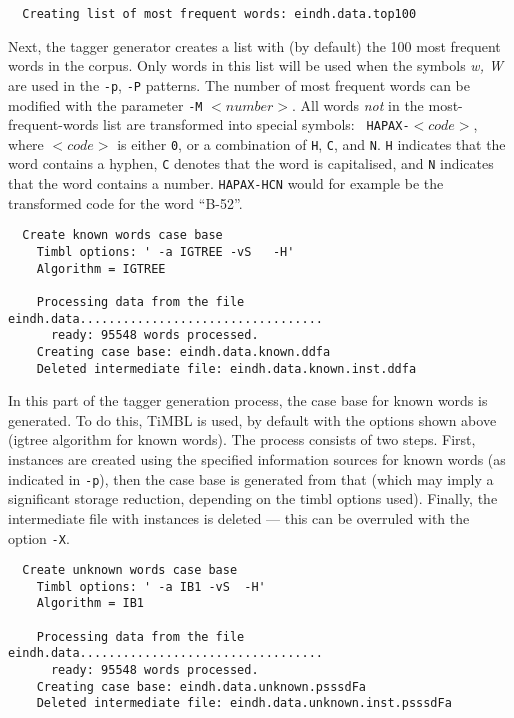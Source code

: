 \documentclass{report}
\begin{document}
{\small
\begin{verbatim}
  Creating list of most frequent words: eindh.data.top100
\end{verbatim}
}

Next, the tagger generator creates a list with (by default) the 100
most frequent words in the corpus. Only words in this list will be
used when the symbols {\em w, W} are used in the {\tt -p}, {\tt -P}
patterns. The number of most frequent words can be modified with the
parameter {\tt -M} $<number>$. All words {\em not}\/ in the
most-frequent-words list are transformed into special symbols: {\tt
HAPAX-}$<code>$, where $<code>$ is either {\tt 0}, or a combination of
{\tt H}, {\tt C}, and {\tt N}. {\tt H} indicates that the word
contains a hyphen, {\tt C} denotes that the word is capitalised, and
{\tt N} indicates that the word contains a number. {\tt HAPAX-HCN}
would for example be the transformed code for the word ``B-52''.

{\small
\begin{verbatim}
  Create known words case base
    Timbl options: ' -a IGTREE -vS   -H'
    Algorithm = IGTREE

    Processing data from the file eindh.data..................................
      ready: 95548 words processed.
    Creating case base: eindh.data.known.ddfa
    Deleted intermediate file: eindh.data.known.inst.ddfa
\end{verbatim}
}

In this part of the tagger generation process, the case base for known
words is generated. To do this, TiMBL is used, by default with
the options shown above ({\sc igtree} algorithm for known
words). The process consists of two steps. First, instances are
created using the specified information sources for known words (as
indicated in {\tt -p}), then the case base is generated from that (which
may imply a significant storage reduction, depending on the {\sc
timbl} options used). Finally, the intermediate file with instances is
deleted --- this can be overruled with the option {\tt -X}.

{\small
\begin{verbatim}
  Create unknown words case base
    Timbl options: ' -a IB1 -vS  -H'
    Algorithm = IB1

    Processing data from the file eindh.data..................................
      ready: 95548 words processed.
    Creating case base: eindh.data.unknown.psssdFa
    Deleted intermediate file: eindh.data.unknown.inst.psssdFa
\end{verbatim}
}
\end{document}
